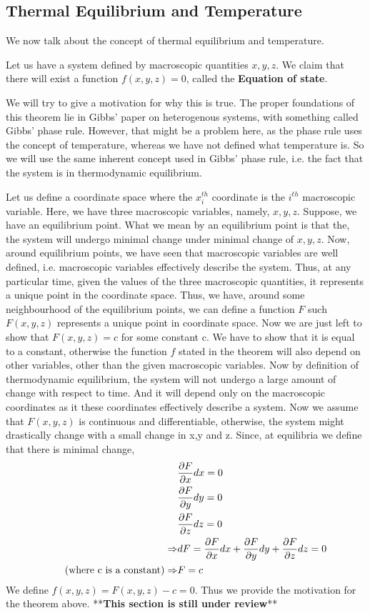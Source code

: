    \subsection{Thermal Equilibrium and Temperature}
   We now talk about the concept of thermal equilibrium and temperature. 
   \begin{tcolorbox}[colback=blue!5!white,colframe=blue!75!black,arc=0mm,title=Theorem]
       Let us have a system defined 
       by macroscopic quantities \(x,y,z\). We claim that there will exist a function \(f(x,y,z) = 0\), called the \textbf{Equation of state}.
   \end{tcolorbox}
   We will try to give a motivation for why this is true. The proper foundations of this theorem lie 
   in Gibbs' paper on heterogenous systems, with something called Gibbs' phase rule. However, that might be a problem here, 
   as the phase rule uses the concept of temperature, whereas we have not defined what temperature is. So we will use the same inherent 
   concept used in Gibbs' phase rule, i.e. the fact that the system is in thermodynamic equilibrium.

   Let us define a coordinate space where the $x_i^{th}$ coordinate is the $i^{th}$ macroscopic variable. Here, we have three macroscopic variables, 
   namely, $x,y,z$. Suppose, we have an equilibrium point. What we mean by an equilibrium point is that the, 
   the system will undergo minimal change under minimal change of $x,y,z$. Now, around equilibrium points, we have seen 
   that macroscopic variables are well defined, i.e. macroscopic variables effectively describe the system. Thus, at any particular time, given 
   the values of the three macroscopic quantities, it represents a unique point in the coordinate space. Thus, we have, around 
   some neighbourhood of the equilibrium points, we can define a function \(F\) such \(F(x,y,z)\) represents a 
   unique point in coordinate space. Now  we are just left to show that \(F(x,y,z) = c\) for some constant c. We have to show that it 
   is equal to a constant, otherwise the function \(f\) stated in the theorem will also depend on other variables, other 
   than the given macroscopic variables. Now by definition of thermodynamic equilibrium, the system will not undergo a large amount 
   of change with respect to time. And it will depend only on the macroscopic coordinates as it these coordinates 
   effectively describe a system. Now we assume that \(F(x,y,z)\) is continuous and differentiable, otherwise, 
   the system might drastically change with a small change in x,y and z. Since, at equilibria we define that there is minimal change,
   \begin{align*} 
       &\pdv{F}{x}dx  =0 \\ 
       &\pdv{F}{y}dy = 0 \\ 
       &\pdv{F}{z}dz = 0 \\ 
       \Rightarrow & dF = \pdv{F}{x}dx+\pdv{F}{y}dy+\pdv{F}{z}dz = 0 \\ 
       \tag{where c is a constant}
       \Rightarrow & F = c 
   \end{align*}
   We define \(f(x,y,z) = F(x,y,z)-c = 0\). Thus we provide the motivation for the theorem above.
   **\textbf{This section is still under review}**
